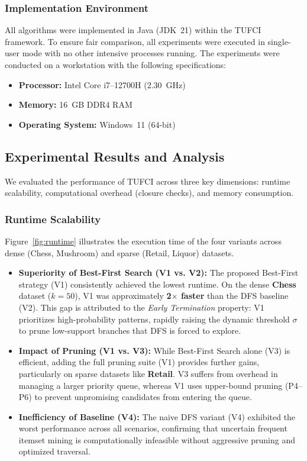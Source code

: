 \documentclass[10pt,letterpaper]{article}
\begin{document}
\subsubsection*{Implementation Environment}

All algorithms were implemented in Java (JDK~21) within the TUFCI framework. To ensure fair comparison, all experiments were executed in single-user mode with no other intensive processes running. The experiments were conducted on a workstation with the following specifications:

\begin{itemize}
    \item \textbf{Processor:} Intel Core i7--12700H (2.30~GHz)
    \item \textbf{Memory:} 16~GB DDR4 RAM
    \item \textbf{Operating System:} Windows~11 (64-bit)
\end{itemize}

\subsection*{Experimental Results and Analysis}

We evaluated the performance of TUFCI across three key dimensions: runtime scalability, computational overhead (closure checks), and memory consumption.

\subsubsection*{Runtime Scalability}
Figure~\ref{fig:runtime} illustrates the execution time of the four variants across dense (Chess, Mushroom) and sparse (Retail, Liquor) datasets.

\begin{itemize}
    \item \textbf{Superiority of Best-First Search (V1 vs. V2):} The proposed Best-First strategy (V1) consistently achieved the lowest runtime. On the dense \textbf{Chess} dataset ($k=50$), V1 was approximately \textbf{2$\times$ faster} than the DFS baseline (V2). This gap is attributed to the \textit{Early Termination} property: V1 prioritizes high-probability patterns, rapidly raising the dynamic threshold $\sigma$ to prune low-support branches that DFS is forced to explore.
    \item \textbf{Impact of Pruning (V1 vs. V3):} While Best-First Search alone (V3) is efficient, adding the full pruning suite (V1) provides further gains, particularly on sparse datasets like \textbf{Retail}. V3 suffers from overhead in managing a larger priority queue, whereas V1 uses upper-bound pruning (P4--P6) to prevent unpromising candidates from entering the queue.
    \item \textbf{Inefficiency of Baseline (V4):} The naive DFS variant (V4) exhibited the worst performance across all scenarios, confirming that uncertain frequent itemset mining is computationally infeasible without aggressive pruning and optimized traversal.
\end{itemize}
\end{document}
